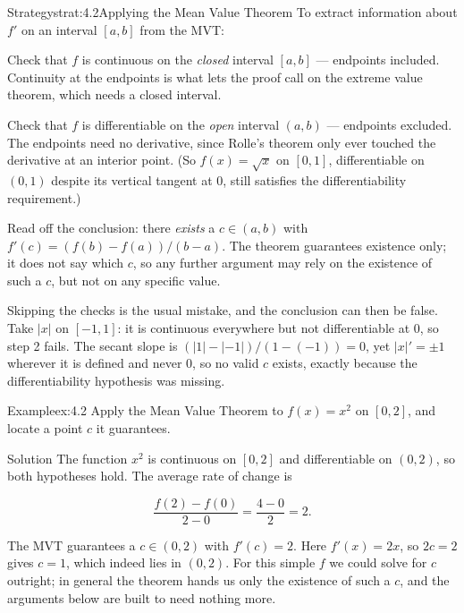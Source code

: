 \documentclass[a4paper,12pt,oneside]{memoir}
\begin{document}
\begin{envstrategy}{Strategy}{strat:4.2}{Applying the Mean Value Theorem}
To extract information about \(f'\) on an interval \([a, b]\) from the MVT:

\begin{steps}
  \item Check that \(f\) is continuous on the \emph{closed} interval \([a, b]\) — endpoints included. Continuity at the endpoints is what lets the proof call on the extreme value theorem, which needs a closed interval.
  \item Check that \(f\) is differentiable on the \emph{open} interval \((a, b)\) — endpoints excluded. The endpoints need no derivative, since Rolle’s theorem only ever touched the derivative at an interior point. (So \(f(x) = \sqrt{x}\) on \([0, 1]\), differentiable on \((0, 1)\) despite its vertical tangent at \(0\), still satisfies the differentiability requirement.)
  \item Read off the conclusion: there \emph{exists} a \(c \in (a, b)\) with \(f'(c) = (f(b) - f(a))/(b - a)\). The theorem guarantees existence only; it does not say which \(c\), so any further argument may rely on the existence of such a \(c\), but not on any specific value.
\end{steps}
Skipping the checks is the usual mistake, and the conclusion can then be false. Take \(\lvert x \rvert\) on \([-1, 1]\): it is continuous everywhere but not differentiable at \(0\), so step 2 fails. The secant slope is \((\lvert 1 \rvert - \lvert -1 \rvert)/(1 - (-1)) = 0\), yet \(\lvert x \rvert' = \pm 1\) wherever it is defined and never \(0\), so no valid \(c\) exists, exactly because the differentiability hypothesis was missing.
\end{envstrategy}
\begin{workedexample}
\begin{envexample}{Example}{ex:4.2}{}
Apply the Mean Value Theorem to \(f(x) = x^{2}\) on \([0, 2]\), and locate a point \(c\) it guarantees.
\end{envexample}
\begin{envsolution}{Solution}{}{}
The function \(x^{2}\) is continuous on \([0, 2]\) and differentiable on \((0, 2)\), so both hypotheses hold. The average rate of change is

\[ \frac{f(2) - f(0)}{2 - 0} = \frac{4 - 0}{2} = 2. \]

The MVT guarantees a \(c \in (0, 2)\) with \(f'(c) = 2\). Here \(f'(x) = 2x\), so \(2c = 2\) gives \(c = 1\), which indeed lies in \((0, 2)\). For this simple \(f\) we could solve for \(c\) outright; in general the theorem hands us only the existence of such a \(c\), and the arguments below are built to need nothing more. \qedmark
\end{envsolution}
\end{workedexample}
\end{document}

